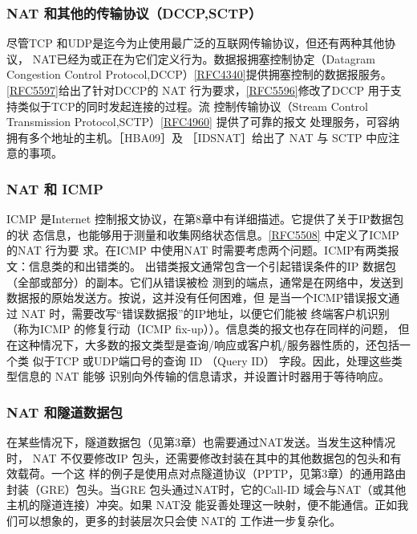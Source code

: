 \subsubsection{NAT 和其他的传输协议（DCCP,SCTP）}

尽管TCP 和UDP是迄今为止使用最广泛的互联网传输协议，但还有两种其他协议，
NAT已经为或正在为它们定义行为。数据报拥塞控制协定（Datagram Congestion Control
Protocol,DCCP）\href{https://www.rfc-editor.org/rfc/rfc4340}{[RFC4340]}提供拥塞控制的数据报服务。\href{https://www.rfc-editor.org/rfc/rfc5597}{[RFC5597]}给出了针对DCCP的
NAT
行为要求，\href{https://www.rfc-editor.org/rfc/rfc5596}{[RFC5596]}修改了DCCP
用于支持类似于TCP的同时发起连接的过程。流
控制传输协议（Stream Control Transmission
Protocol,SCTP）\href{https://www.rfc-editor.org/rfc/rfc4960}{[RFC4960]} 提供了可靠的报文
处理服务，可容纳拥有多个地址的主机。［HBA09］及 ［IDSNAT］给出了 NAT 与 SCTP 中应注
意的事项。

\subsubsection{NAT 和 ICMP}

ICMP 是Internet 控制报文协议，在第8章中有详细描述。它提供了关于IP数据包的状
态信息，也能够用于测量和收集网络状态信息。\href{https://www.rfc-editor.org/rfc/rfc5508}{[RFC5508]}
中定义了ICMP 的NAT 行为要
求。在ICMP 中使用NAT 时需要考虑两个问题。ICMP有两类报文：信息类的和出错类的。
出错类报文通常包含一个引起错误条件的IP 数据包（全部或部分）的副本。它们从错误被检
测到的端点，通常是在网络中，发送到数据报的原始发送方。按说，这并没有任何困难，但
是当一个ICMP错误报文通过 NAT 时，需要改写“错误数据报”的IP地址，以便它们能被
终端客户机识别（称为ICMP 的修复行动（ICMP fix-up））。信息类的报文也存在同样的问题，
但在这种情况下，大多数的报文类型是查询/响应或客户机/服务器性质的，还包括一个类
似于TCP 或UDP端口号的查询 ID （Query ID） 字段。因此，处理这些类型信息的 NAT 能够
识别向外传输的信息请求，并设置计时器用于等待响应。

\subsubsection{NAT 和隧道数据包}

在某些情况下，隧道数据包（见第3章）也需要通过NAT发送。当发生这种情况时，
NAT 不仅要修改IP 包头，还需要修改封装在其中的其他数据包的包头和有效载荷。一个这
样的例子是使用点对点隧道协议（PPTP，见第3章）的通用路由封装（GRE）包头。当GRE
包头通过NAT时，它的Call-ID 域会与NAT（或其他主机的隧道连接）冲突。如果 NAT没
能妥善处理这一映射，便不能通信。正如我们可以想象的，更多的封装层次只会使 NAT的
工作进一步复杂化。

